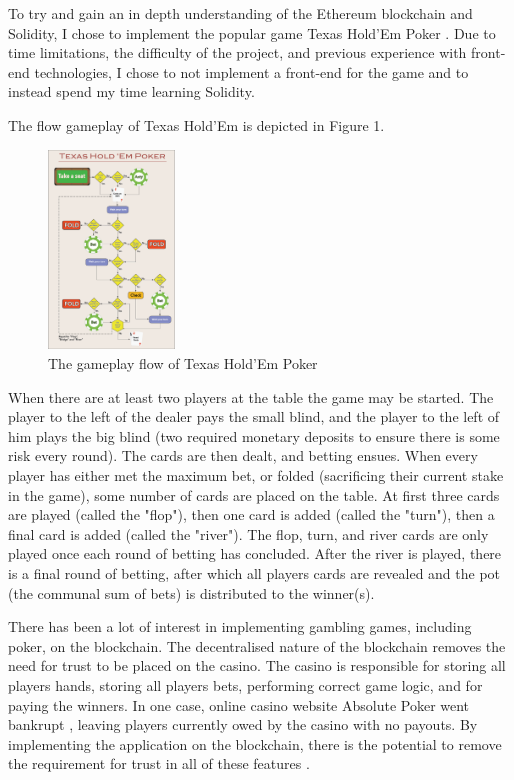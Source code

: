 To try and gain an in depth understanding of the Ethereum blockchain and Solidity, I chose to implement the popular game Texas Hold'Em Poker \cite{texasHoldEm}. Due to time limitations, the difficulty of the project, and previous experience with front-end technologies, I chose to not implement a front-end for the game and to instead spend my time learning Solidity.

The flow gameplay of Texas Hold'Em is depicted in Figure 1.

\begin{figure}
	\includegraphics[width=0.3\textwidth]{flow}
	\caption{The gameplay flow of Texas Hold'Em Poker}
	\label{fig:key}
\end{figure}

When there are at least two players at the table the game may be started. The player to the left of the dealer pays the small blind, and the player to the left of him plays the big blind (two required monetary deposits to ensure there is some risk every round). The cards are then dealt, and betting ensues. When every player has either met the maximum bet, or folded (sacrificing their current stake in the game), some number of cards are placed on the table. At first three cards are played (called the "flop"), then one card is added (called the "turn"), then a final card is added (called the "river"). The flop, turn, and river cards are only played once each round of betting has concluded. After the river is played, there is a final round of betting, after which all players cards are revealed and the pot (the communal sum of bets) is distributed to the winner(s).

There has been a lot of interest in implementing gambling games, including poker, on the blockchain. The decentralised nature of the blockchain removes the need for trust to be placed on the casino. The casino is responsible for storing all players hands, storing all players bets, performing correct game logic, and for paying the winners. In one case, online casino website Absolute Poker went bankrupt \cite{abspoker}, leaving players currently owed by the casino with no payouts. By implementing the application on the blockchain, there is the potential to remove the requirement for trust in all of these features \cite{trust}.